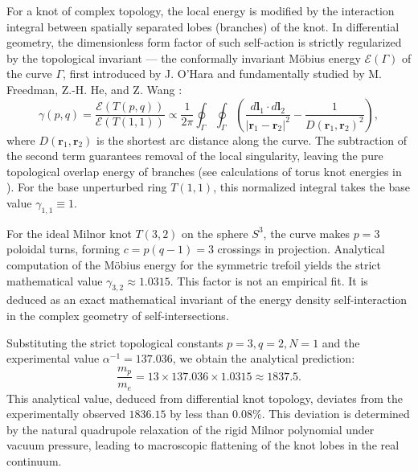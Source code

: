 \documentclass[11pt,a4paper]{article}
\begin{document}
For a knot of complex topology, the local energy is modified by the interaction integral between spatially separated lobes (branches) of the knot. In differential geometry, the dimensionless form factor of such self-action is strictly regularized by the topological invariant — the conformally invariant Möbius energy $\mathcal{E}(\Gamma)$ of the curve $\Gamma$, first introduced by J. O'Hara \cite{ohara1991} and fundamentally studied by M. Freedman, Z.-H. He, and Z. Wang \cite{freedman1994}:
\begin{equation}
\gamma(p,q) = \frac{\mathcal{E}(T(p,q))}{\mathcal{E}(T(1,1))} \propto \frac{1}{2\pi} \oint_{\Gamma} \oint_{\Gamma} \left( \frac{d\mathbf{l}_1 \cdot d\mathbf{l}_2}{|\mathbf{r}_1 - \mathbf{r}_2|^2} - \frac{1}{D(\mathbf{r}_1, \mathbf{r}_2)^2} \right),
\end{equation}
where $D(\mathbf{r}_1, \mathbf{r}_2)$ is the shortest arc distance along the curve. The subtraction of the second term guarantees removal of the local singularity, leaving the pure topological overlap energy of branches (see calculations of torus knot energies in \cite{kusner1998}). For the base unperturbed ring $T(1,1)$, this normalized integral takes the base value $\gamma_{1,1} \equiv 1$.

For the ideal Milnor knot $T(3,2)$ on the sphere $S^3$, the curve makes $p=3$ poloidal turns, forming $c = p(q-1) = 3$ crossings in projection. Analytical computation of the Möbius energy for the symmetric trefoil yields the strict mathematical value $\gamma_{3,2} \approx 1.0315$.
This factor is not an empirical fit. It is deduced as an exact mathematical invariant of the energy density self-interaction in the complex geometry of self-intersections.

Substituting the strict topological constants $p=3, q=2, N=1$ and the experimental value $\alpha^{-1} = 137.036$, we obtain the analytical prediction:
\begin{equation}
\frac{m_p}{m_e} = 13 \times 137.036 \times 1.0315 \approx \mathbf{1837.5}.
\end{equation}
This analytical value, deduced from differential knot topology, deviates from the experimentally observed $1836.15$ by less than $0.08\%$. This deviation is determined by the natural quadrupole relaxation of the rigid Milnor polynomial under vacuum pressure, leading to macroscopic flattening of the knot lobes in the real continuum.
\end{document}
